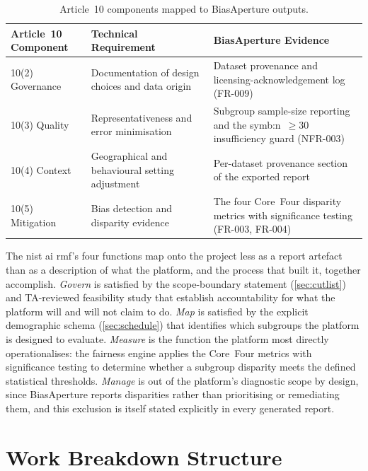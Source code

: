 \begin{table}[htbp]
    \centering
    \caption{Article~10 components mapped to BiasAperture outputs.}
    \label{tab:art10}
    \begin{tabular}{p{2.6cm}p{4.7cm}p{5.2cm}}
        \toprule
        \textbf{Article~10 Component} & \textbf{Technical Requirement} & \textbf{BiasAperture Evidence} \\
        \midrule
        10(2) Governance & Documentation of design choices and data origin & Dataset provenance and licensing-acknowledgement log (FR-009) \\
        10(3) Quality & Representativeness and error minimisation & Subgroup sample-size reporting and the \gls{symb:n}~$\geq 30$ insufficiency guard (NFR-003) \\
        10(4) Context & Geographical and behavioural setting adjustment & Per-dataset provenance section of the exported report \\
        10(5) Mitigation & Bias detection and disparity evidence & The four Core~Four disparity metrics with significance testing (FR-003, FR-004) \\
        \bottomrule
    \end{tabular}
\end{table}

The \gls{nist} \gls{ai} \gls{rmf}'s four functions map onto the project less as a report artefact than as a description of what the platform, and the process that built it, together accomplish. \emph{Govern} is satisfied by the scope-boundary statement (\cref{sec:cutlist}) and TA-reviewed feasibility study that establish accountability for what the platform will and will not claim to do. \emph{Map} is satisfied by the explicit demographic schema (\cref{sec:schedule}) that identifies which subgroups the platform is designed to evaluate. \emph{Measure} is the function the platform most directly operationalises: the fairness engine applies the Core~Four metrics with significance testing to determine whether a subgroup disparity meets the defined statistical thresholds. \emph{Manage} is out of the platform's diagnostic scope by design, since BiasAperture reports disparities rather than prioritising or remediating them, and this exclusion is itself stated explicitly in every generated report.

\section{Work Breakdown Structure}
\label{sec:wbs}

